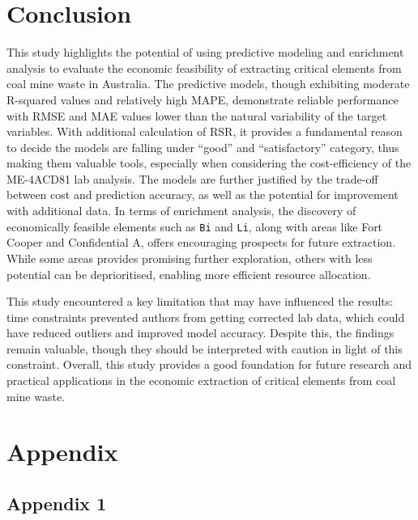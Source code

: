 \documentclass[11pt,a4paper,]{article}
\begin{document}
\section{Conclusion}\label{conclusion}

This study highlights the potential of using predictive modeling and enrichment analysis to evaluate the economic feasibility of extracting critical elements from coal mine waste in Australia. The predictive models, though exhibiting moderate R-squared values and relatively high MAPE, demonstrate reliable performance with RMSE and MAE values lower than the natural variability of the target variables. With additional calculation of RSR, it provides a fundamental reason to decide the models are falling under ``good'' and ``satisfactory'' category, thus making them valuable tools, especially when considering the cost-efficiency of the ME-4ACD81 lab analysis. The models are further justified by the trade-off between cost and prediction accuracy, as well as the potential for improvement with additional data. In terms of enrichment analysis, the discovery of economically feasible elements such as \texttt{Bi} and \texttt{Li}, along with areas like Fort Cooper and Confidential A, offers encouraging prospects for future extraction. While some areas provides promising further exploration, others with less potential can be deprioritised, enabling more efficient resource allocation.

This study encountered a key limitation that may have influenced the results: time constraints prevented authors from getting corrected lab data, which could have reduced outliers and improved model accuracy. Despite this, the findings remain valuable, though they should be interpreted with caution in light of this constraint. Overall, this study provides a good foundation for future research and practical applications in the economic extraction of critical elements from coal mine waste.

\newpage

\section{Appendix}\label{appendix}

\subsection{Appendix 1}\label{sec-appendixone}

\begingroup\fontsize{9}{11}\selectfont
\end{document}

